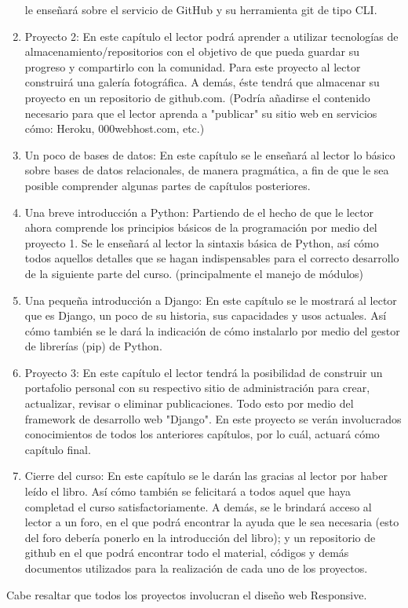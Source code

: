 \documentclass{article}
\begin{document}
\begin{enumerate}
    le enseñará sobre el servicio de GitHub y su herramienta git de tipo CLI.
    \item Proyecto 2: En este capítulo el lector podrá aprender a utilizar tecnologías de almacenamiento/repositorios con el objetivo de 
    que pueda guardar su progreso y compartirlo con la comunidad. Para este proyecto al lector construirá una galería fotográfica. 
    A demás, éste tendrá que almacenar su proyecto en un repositorio de github.com. 
    (Podría añadirse el contenido necesario para que el lector aprenda a "publicar" su sitio web en servicios cómo: Heroku, 000webhost.com,
    etc.)
    \item Un poco de bases de datos: En este capítulo se le enseñará al lector lo básico sobre bases de datos relacionales, de manera
    pragmática, a fin de que le sea posible comprender algunas partes de capítulos posteriores. 
    \item Una breve introducción a Python: Partiendo de el hecho de que le lector ahora comprende los principios básicos de la programación
    por medio del proyecto 1. Se le enseñará al lector la sintaxis básica de Python, así cómo todos aquellos detalles que se hagan
    indispensables para el correcto desarrollo de la siguiente parte del curso. (principalmente el manejo de módulos)
    \item Una pequeña introducción a Django: En este capítulo se le mostrará al lector que es Django, un poco de su historia, 
    sus capacidades y usos actuales. Así cómo también se le dará la indicación de cómo instalarlo por medio del gestor de librerías (pip) 
    de Python.
    \item Proyecto 3: En este capítulo el lector tendrá la posibilidad de construir un portafolio personal con su respectivo sitio de
    administración para crear, actualizar, revisar o eliminar publicaciones. Todo esto por medio del framework de desarrollo web "Django". En este proyecto se verán involucrados conocimientos de todos los anteriores capítulos, por lo cuál, actuará cómo capítulo final. 
    \item Cierre del curso: En este capítulo se le darán las gracias al lector por haber leído el libro. Así cómo también se felicitará a
    todos aquel que haya completad el curso satisfactoriamente. A demás, se le brindará acceso al lector a un foro, en el que podrá
    encontrar la ayuda que le sea necesaria (esto del foro debería ponerlo en la introducción del libro); y un repositorio de github en el
    que podrá encontrar todo el material, códigos y demás documentos utilizados para la realización de cada uno de los proyectos. 
\end{enumerate}

Cabe resaltar que todos los proyectos involucran el diseño web Responsive. 
\end{document}
